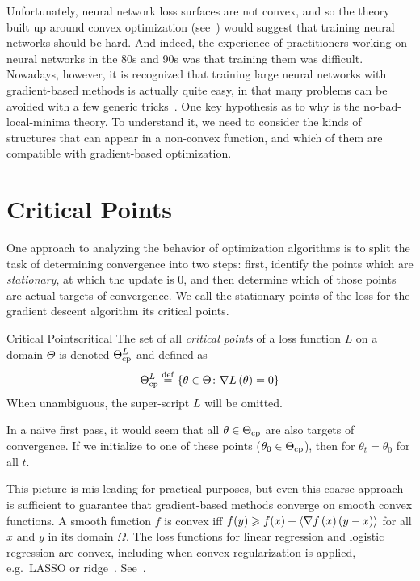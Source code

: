 \documentclass[../../thesis.tex]{subfiles}
\begin{document}
Unfortunately,
neural network loss surfaces are not convex,
and so the theory built up around convex optimization
(see~\cite{bubeck2015,boyd2004})
would suggest that training neural networks should be hard.
And indeed, the experience of practitioners
working on neural networks in the 80s and 90s
was that training them was difficult.
Nowadays, however,
it is recognized that training large neural networks
with gradient-based methods
is actually quite easy,
in that many problems can be avoided with
a few generic tricks~\cite{sun2019}.
One key hypothesis as to why is the
no-bad-local-minima theory.
To understand it,
we need to consider the kinds of structures
that can appear in a non-convex function,
and which of them are compatible with gradient-based optimization.

\section{Critical Points}

One approach to analyzing the behavior of optimization algorithms
is to split the task of determining convergence
into two steps:
first, identify the points which are \emph{stationary},
at which the update is $0$,
and then determine which of those points are actual targets of convergence.
We call the stationary points of the loss
for the gradient descent algorithm its critical points.
\begin{definition}{Critical Points}{critical}
	The set of all \emph{critical points} of a loss function $L$
	on a domain $\Theta$ is denoted $\Theta^L_{\mathrm{cp}}$ and defined as
	\begin{equation}\equationlabel{def-thetacp}
		\Theta^L_{\cp} \defeq \Set{\theta \in \Theta \suchthat \grad{L}{\theta} = 0}
	\end{equation}
	When unambiguous, the super-script $L$ will be omitted.
\end{definition}
In a na{\"\i}ve first pass,
it would seem that all $\theta \in \Theta_{\mathrm{cp}}$
are also targets of convergence.
If we initialize  to one of these points
($\theta_{0} \in \Theta_{\mathrm{cp}}$),
then for $\theta_t = \theta_0$ for all $t$.

This picture is mis-leading for practical purposes,
but even this coarse approach is sufficient to guarantee
that gradient-based methods converge on smooth convex functions.
A smooth function $f$ is convex iff
$f(y) \geqslant f(x) + \langle\nabla f\left(x\right)(y - x)\rangle$
for all $x$ and $y$ in its domain $\Omega$.
The loss functions for linear regression and
logistic regression are convex,
including when convex regularization is applied,
e.g.~LASSO or ridge~\cite{hastie2016}.
See~.
\end{document}
